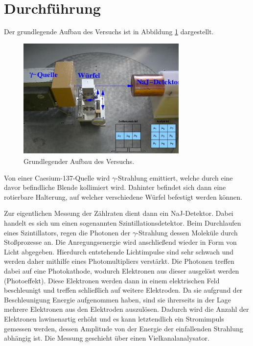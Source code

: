 \section{Durchführung}
\label{sec:Durchführung}

Der grundlegende Aufbau des Versuchs ist in Abbildung \ref{fig:aufbau} dargestellt.

\begin{figure}[H]
  \centering
  \includegraphics[height=6cm]{Aufbau.PNG}
  \caption{Grundlegender Aufbau des Versuchs. \cite{sample}}
  \label{fig:aufbau}
\end{figure}

Von einer Caesium-137-Quelle wird $\gamma$-Strahlung emittiert, welche durch eine
davor befindliche Blende kollimiert wird. Dahinter befindet sich dann eine rotierbare
Halterung, auf welcher verschiedene Würfel befestigt werden können.

Zur eigentlichen Messung der Zählraten dient dann ein NaJ-Detektor.
Dabei handelt es sich um einen sogenannten Szintillationsdetektor.
Beim Durchlaufen eines Szintillators, regen die Photonen der $\gamma$-Strahlung dessen
Moleküle durch Stoßprozesse an. Die Anregungsenergie wird anschließend wieder in Form
von Licht abgegeben. Hierdurch entstehende Lichtimpulse sind sehr schwach und
werden daher mithilfe eines Photomultipliers verstärkt. Die Photonen treffen dabei
auf eine Photokathode, wodurch Elektronen aus dieser ausgelöst werden (Photoeffekt).
Diese Elektronen werden dann in einem elektrischen Feld beschleunigt und treffen
schließlich auf weitere Elektroden. Da sie aufgrund der Beschleunigung Energie
aufgenommen haben, sind sie ihrerseits in der Lage mehrere
Elektronen aus den Elektroden auszulösen. Dadurch wird die Anzahl der Elektronen lawinenartig erhöht
und es kann letztendlich ein Stromimpuls gemessen werden, dessen Amplitude von der
Energie der einfallenden Strahlung abhängig ist. Die Messung geschieht über einen Vielkanalanalysator.

